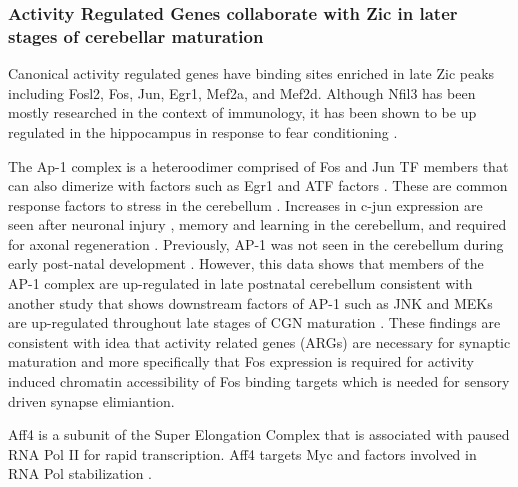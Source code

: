 \documentclass[fleqn,10pt,twocolumn]{wlscirep}
\begin{document}
\subsubsection*{Activity Regulated Genes collaborate with Zic in later stages of cerebellar maturation}
Canonical activity regulated genes have binding sites enriched in late Zic peaks including Fosl2, Fos, Jun, Egr1, Mef2a, and Mef2d. Although Nfil3 has been mostly researched in the context of immunology, it has been shown to be up regulated in the hippocampus in response to fear conditioning \cite{Mizuno2020Long-lastingConditioning}.

The Ap-1 complex is a heteroodimer comprised of Fos and Jun TF members that can also dimerize with factors such as Egr1 and ATF factors \cite{Raivich2006RoleBrain}. These are common response factors to stress in the cerebellum \cite{Nakamura2015ExpressionActivity, Coffey2000DualNeurons}. Increases in c-jun expression are seen after neuronal injury \cite{Liu2000TranstentorialMice}, memory and learning in the cerebellum, and required for axonal regeneration \cite{Raivich2004TheRegeneration, Raivich2006RoleBrain}. Previously, AP-1 was not seen in the cerebellum during early post-natal development \cite{Guerrini1997Glutamate-DependentDevelopment}. However, this data shows that members of the AP-1 complex are up-regulated in late postnatal cerebellum consistent with another study that shows downstream factors of AP-1 such as JNK and MEKs are up-regulated throughout late stages of CGN maturation \cite{Coffey2000DualNeurons}. These findings are consistent with idea that activity related genes (ARGs) are necessary for synaptic maturation\cite{West2011NeuronalFunction} and more specifically that Fos expression is required for activity induced chromatin accessibility of Fos binding targets\cite{Su2017NeuronalBrain} which is needed for sensory driven synapse elimiantion. 

Aff4 is a subunit of the Super Elongation Complex that is associated with paused RNA Pol II for rapid transcription. Aff4 targets Myc and factors involved in RNA Pol stabilization \cite{Luo2012TheControl}.

\end{document}
